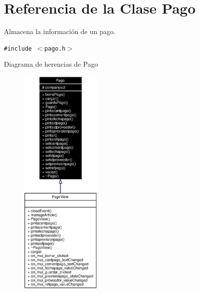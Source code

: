 \section{Referencia de la Clase Pago}
\label{classPago}
Almacena la informaci\'{o}n de un pago.  


{\tt \#include $<$pago.h$>$}

Diagrama de herencias de Pago\begin{figure}[H]
\begin{center}
\leavevmode
\includegraphics[width=114pt]{classPago__inherit__graph}
\end{center}
\end{figure}
